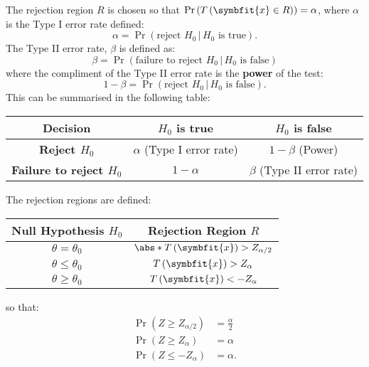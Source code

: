 \documentclass{article}
\begin{document}
The rejection region \(R\) is chosen so that \(\Pr{\left( T\left( \symbfit{x} \in R \right) \right)} = \alpha\),
where \(\alpha\) is the Type I error rate defined:
\begin{equation*}
    \alpha = \Pr{\left( \text{reject \(H_0\)} \,\vert\, \text{\(H_0\) is true} \right)}.
\end{equation*}
The Type II error rate, \(\beta\) is defined as:
\begin{equation*}
    \beta = \Pr{\left( \text{failure to reject \(H_0\)} \,\vert\, \text{\(H_0\) is false} \right)}
\end{equation*}
where the compliment of the Type II error rate is the \textbf{power} of the test:
\begin{equation*}
    1 - \beta = \Pr{\left( \text{reject \(H_0\)} \,\vert\, \text{\(H_0\) is false} \right)}.
\end{equation*}
This can be summarised in the following table:
\begin{center}
    \begin{tabular}{c|cc}
        \toprule
        \textbf{Decision}                  & \textbf{\(H_0\) is true}       & \textbf{\(H_0\) is false}      \\
        \midrule
        \textbf{Reject \(H_0\)}            & \(\alpha\) (Type I error rate) & \(1 - \beta\) (Power)          \\
        \textbf{Failure to reject \(H_0\)} & \(1 - \alpha\)                 & \(\beta\) (Type II error rate) \\
        \bottomrule
    \end{tabular}
\end{center}
The rejection regions are defined:
\begin{center}
    \begin{tabular}{cc}
        \toprule
        \textbf{Null Hypothesis} \(H_0\) & \textbf{Rejection Region} \(R\)                       \\
        \midrule
        \(\theta = \theta_0\)            & \(\abs*{T\left( \symbfit{x} \right)} > Z_{\alpha/2}\) \\
        \(\theta \leq \theta_0\)         & \(T\left( \symbfit{x} \right) > Z_{\alpha}\)          \\
        \(\theta \geq \theta_0\)         & \(T\left( \symbfit{x} \right) < -Z_{\alpha}\)         \\
        \bottomrule
    \end{tabular}
\end{center}
so that:
\begin{align*}
    \Pr{\left( Z \geq Z_{\alpha / 2} \right)} & = \frac{\alpha}{2} \\
    \Pr{\left( Z \geq Z_{\alpha} \right)}     & = \alpha           \\
    \Pr{\left( Z \leq -Z_{\alpha} \right)}    & = \alpha.
\end{align*}
\end{document}

